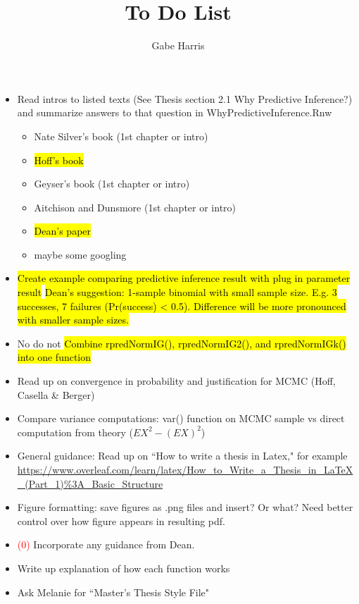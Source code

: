 \documentclass[12pt, a4paper]{article}
\begin{document}
% 
% 





\title{To Do List}
\author{\Large Gabe Harris}
\maketitle

\begin{itemize}
  \item Read intros to listed texts (See Thesis section 2.1 Why Predictive Inference?) and summarize answers to that question in WhyPredictiveInference.Rnw
    \begin{itemize}
      \item Nate Silver's book (1st chapter or intro)
      \item \hl{Hoff's book}
      \item Geyser's book (1st chapter or intro)
      \item Aitchison and Dunsmore (1st chapter or intro)
      \item \hl{Dean's paper}
      \item maybe some googling
    \end{itemize}
  \item \hl{Create example comparing predictive inference result with plug in parameter result}
    \subitem \hl{Dean's suggestion:  1-sample binomial with small sample size.  E.g. 3 successes, 7 failures (Pr(success) < 0.5).  Difference will be more pronounced with smaller sample sizes.}
  \item No do not \hl{Combine rpredNormIG(), rpredNormIG2(), and rpredNormIGk() into one function}
  \item Read up on convergence in probability and justification for MCMC (Hoff, Casella \& Berger)
  \item Compare variance computations: var() function on MCMC sample vs direct computation from theory ($EX^2 - (EX)^2$)
  \item General guidance:  Read up on ``How to write a thesis in Latex," for example \url{https://www.overleaf.com/learn/latex/How_to_Write_a_Thesis_in_LaTeX_(Part_1)%3A_Basic_Structure}
  \item Figure formatting:  save figures as .png files and insert?  Or what?  Need better control over how figure appears in resulting pdf.
  \item \textcolor{red}{(0)} Incorporate any guidance from Dean.
  \item Write up explanation of how each function works
  \item Ask Melanie for ``Master's Thesis Style File"
\end{itemize}
\end{document}
